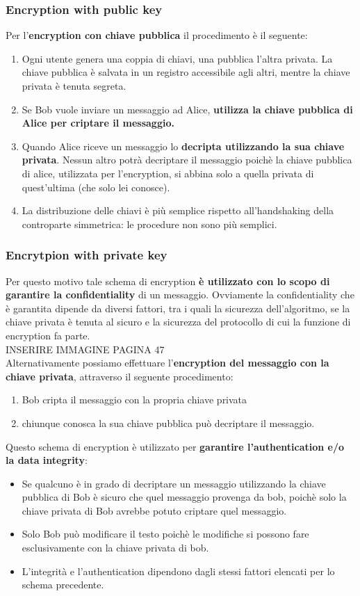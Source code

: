 \documentclass[12pt]{article}
\begin{document}
		\subsubsection{Encryption with public key}
			Per l'\textbf{encryption con chiave pubblica} il procedimento è il seguente:
			\begin{enumerate}
				\item Ogni utente genera una coppia di chiavi, una pubblica l'altra privata. La chiave pubblica è salvata in un registro accessibile agli altri, mentre la chiave privata è tenuta segreta.
				\item Se Bob vuole inviare un messaggio ad Alice, \textbf{utilizza la chiave pubblica di Alice per criptare il messaggio.}
				\item Quando Alice riceve un messaggio lo \textbf{decripta utilizzando la sua chiave privata}. Nessun altro potrà decriptare il messaggio poichè la chiave pubblica di alice, utilizzata per l'encryption, si abbina solo a quella privata di quest'ultima (che solo lei conosce).
				\item La distribuzione delle chiavi è più semplice rispetto all'handshaking della controparte simmetrica: le procedure non sono più semplici. 
			\end{enumerate}
		\subsubsection{Encrytpion with private key}
			Per questo motivo tale schema di encryption \textbf{è utilizzato con lo scopo di garantire la confidentiality} di un messaggio. Ovviamente la confidentiality che è garantita dipende da diversi fattori, tra i quali la sicurezza dell'algoritmo, se la chiave privata è tenuta al sicuro e la sicurezza del protocollo di cui la funzione di encryption fa parte.\\
			INSERIRE IMMAGINE PAGINA 47\\
			Alternativamente possiamo effettuare l'\textbf{encryption del messaggio con la chiave privata}, attraverso il seguente procedimento:
			\begin{enumerate}
				\item Bob cripta il messaggio con la propria chiave privata 	
				\item chiunque conosca la sua chiave pubblica può decriptare il messaggio.
			\end{enumerate}
			Questo schema di encryption è utilizzato per \textbf{garantire l'authentication e/o la data integrity}:
			\begin{itemize}
				\item Se qualcuno è in grado di decriptare un messaggio utilizzando la chiave pubblica di Bob è sicuro che quel messaggio provenga da bob, poichè solo la chiave privata di Bob avrebbe potuto criptare quel messaggio.
				\item Solo Bob può modificare il testo poichè le modifiche si possono fare esclusivamente con la chiave privata di bob.
				\item L'integrità e l'authentication dipendono dagli stessi fattori elencati per lo schema precedente.
			\end{itemize}
\end{document}
